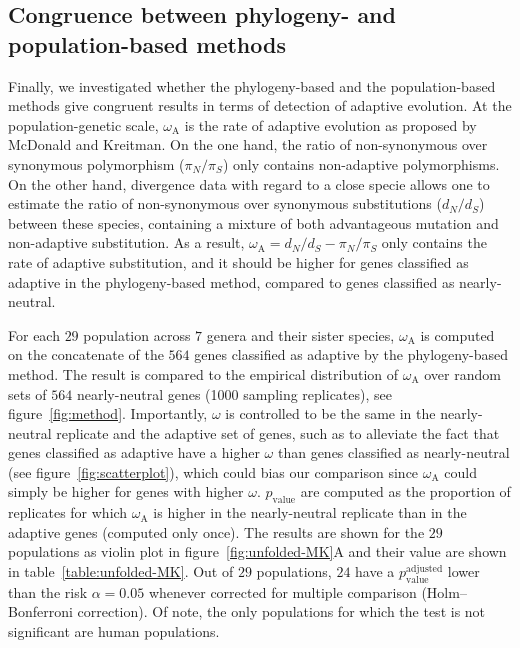 \documentclass{article}
\newcommand{\dn}{d_N}
\newcommand{\ds}{d_S}
\newcommand{\dnds}{\dn / \ds}
\newcommand{\pn}{\pi_N}
\newcommand{\ps}{\pi_S}
\newcommand{\pnps}{\pn / \ps}
\begin{document}
\subsection*{Congruence between phylogeny- and population-based methods}

Finally, we investigated whether the phylogeny-based and the population-based methods give congruent results in terms of detection of adaptive evolution.
At the population-genetic scale, $\omega_{\mathrm{A}}$ is the rate of adaptive evolution as proposed by McDonald and Kreitman\cite{mcdonald_adaptative_1991}.
On the one hand, the ratio of non-synonymous over synonymous polymorphism ($\pnps$) only contains non-adaptive polymorphisms.
On the other hand, divergence data with regard to a close specie allows one to estimate the ratio of non-synonymous over synonymous substitutions ($\dnds$) between these species, containing a mixture of both advantageous mutation and non-adaptive substitution.
As a result, $\omega_{\mathrm{A}} = \dnds - \pnps$ only contains the rate of adaptive substitution, and it should be higher for genes classified as adaptive in the phylogeny-based method, compared to genes classified as nearly-neutral.

For each $29$ population across $7$ genera and their sister species, $\omega_{\mathrm{A}}$ is computed on the concatenate of the $564$ genes classified as adaptive by the phylogeny-based method.
The result is compared to the empirical distribution of $\omega_{\mathrm{A}}$ over random sets of $564$ nearly-neutral genes (1000 sampling replicates), see figure~\ref{fig:method}.
Importantly, $\omega$ is controlled to be the same in the nearly-neutral replicate and the adaptive set of genes, such as to alleviate the fact that genes classified as adaptive have a higher $\omega$ than genes classified as nearly-neutral (see figure~\ref{fig:scatterplot}), which could bias our comparison since $\omega_{\mathrm{A}}$ could simply be higher for genes with higher $\omega$.
$p_{\mathrm{value}}$ are computed as the proportion of replicates for which $\omega_{\mathrm{A}}$ is higher in the nearly-neutral replicate than in the adaptive genes (computed only once).
The results are shown for the $29$ populations as violin plot in figure~\ref{fig:unfolded-MK}A and their value are shown in table~\ref{table:unfolded-MK}.
Out of $29$ populations, $24$ have a $p_{\mathrm{value}}^{\mathrm{adjusted}}$ lower than the risk $\alpha=0.05$ whenever corrected for multiple comparison (Holm–Bonferroni correction).
Of note, the only populations for which the test is not significant are human populations.
\end{document}
